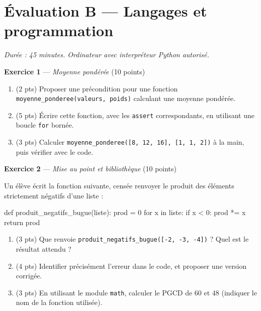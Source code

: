 \section*{Évaluation B --- Langages et programmation}
\textit{Durée : 45 minutes. Ordinateur avec interpréteur Python autorisé.}


\bigskip

\textbf{Exercice 1} --- \textit{Moyenne pondérée} \hfill (10 points)

\begin{enumerate}
  \item (2 pts) Proposer une précondition pour une fonction \lstinline{moyenne_ponderee(valeurs, poids)} calculant une moyenne pondérée.
  \item (5 pts) Écrire cette fonction, avec les \lstinline{assert} correspondants, en utilisant une boucle \lstinline{for} bornée.
  \item (3 pts) Calculer \lstinline{moyenne_ponderee([8, 12, 16], [1, 1, 2])} à la main, puis vérifier avec le code.
\end{enumerate}


\bigskip

\textbf{Exercice 2} --- \textit{Mise au point et bibliothèque} \hfill (10 points)

Un élève écrit la fonction suivante, censée renvoyer le produit des éléments strictement
négatifs d'une liste :
\begin{python}
def produit_negatifs_bugue(liste):
    prod = 0
    for x in liste:
        if x < 0:
            prod *= x
    return prod
\end{python}

\begin{enumerate}
  \item (3 pts) Que renvoie \lstinline{produit_negatifs_bugue([-2, -3, -4])} ? Quel est le résultat attendu ?
  \item (4 pts) Identifier précisément l'erreur dans le code, et proposer une version corrigée.
  \item (3 pts) En utilisant le module \lstinline{math}, calculer le PGCD de $60$ et $48$ (indiquer le nom de la fonction utilisée).
\end{enumerate}

